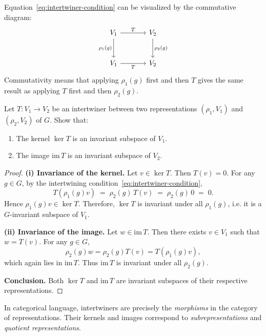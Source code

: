 \begin{remark}
Equation~\eqref{eq:intertwiner-condition} can be visualized by the commutative diagram:
\[
\begin{tikzcd}[row sep=large, column sep=large]
V_1 \arrow[r,"T"] \arrow[d,"\rho_1(g)"'] & V_2 \arrow[d,"\rho_2(g)"] \\
V_1 \arrow[r,"T"'] & V_2
\end{tikzcd}
\]
Commutativity means that applying $\rho_1(g)$ first and then $T$ gives the same result
as applying $T$ first and then $\rho_2(g)$.
\end{remark}

\begin{exercise}[1.2.12]\label{ex:1.2.12}
Let $T:V_1\to V_2$ be an intertwiner between two representations $(\rho_1,V_1)$ and $(\rho_2,V_2)$ of $G$.
Show that:
\begin{enumerate}[label=(\roman*)]
    \item The kernel $\ker T$ is an invariant subspace of $V_1$.
    \item The image $\mathrm{im}\,T$ is an invariant subspace of $V_2$.
\end{enumerate}
\end{exercise}

\begin{proof}
\textbf{(i) Invariance of the kernel.}  
Let $v\in\ker T$. Then $T(v)=0$.  
For any $g\in G$, by the intertwining condition~\eqref{eq:intertwiner-condition},
\[
T(\rho_1(g)v) \;=\; \rho_2(g)\,T(v) \;=\; \rho_2(g)\,0 \;=\; 0.
\]
Hence $\rho_1(g)v\in\ker T$.  
Therefore, $\ker T$ is invariant under all $\rho_1(g)$, i.e. it is a $G$-invariant subspace of $V_1$.

\smallskip
\textbf{(ii) Invariance of the image.}  
Let $w\in\mathrm{im}\,T$. Then there exists $v\in V_1$ such that $w=T(v)$.  
For any $g\in G$,
\[
\rho_2(g)w = \rho_2(g)T(v) = T(\rho_1(g)v),
\]
which again lies in $\mathrm{im}\,T$.  
Thus $\mathrm{im}\,T$ is invariant under all $\rho_2(g)$.

\smallskip
\noindent
\textbf{Conclusion.}
Both $\ker T$ and $\mathrm{im}\,T$ are invariant subspaces of their respective representations.
\end{proof}

\begin{remark}
In categorical language, intertwiners are precisely the \emph{morphisms} in the category of representations.
Their kernels and images correspond to \emph{subrepresentations} and \emph{quotient representations}.
\end{remark}


